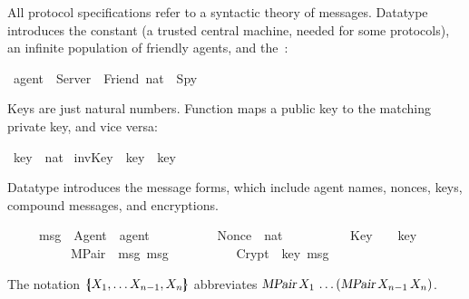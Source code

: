 %
\begin{isabellebody}%
\def\isabellecontext{Message}%
%
\isadelimtheory
%
\endisadelimtheory
%
\isatagtheory
%
\endisatagtheory
{\isafoldtheory}%
%
\isadelimtheory
%
\endisadelimtheory
%
\isadelimML
%
\endisadelimML
%
\isatagML
%
\endisatagML
{\isafoldML}%
%
\isadelimML
%
\endisadelimML
%
\isadelimproof
%
\endisadelimproof
%
\isatagproof
%
\endisatagproof
{\isafoldproof}%
%
\isadelimproof
%
\endisadelimproof
%
\isamarkuptrue%
%
\begin{isamarkuptext}%
All protocol specifications refer to a syntactic theory of messages. 
Datatype
 introduces the constant  (a trusted central
machine, needed for some protocols), an infinite population of
friendly agents, and the~:%
\end{isamarkuptext}%
\isamarkuptrue%
\isamarkupfalse%
\ agent\ {}\ Server\ {}\ Friend\ nat\ {}\ Spy%
\begin{isamarkuptext}%
Keys are just natural numbers.  Function  maps a public key to
the matching private key, and vice versa:%
\end{isamarkuptext}%
\isamarkuptrue%
\isamarkupfalse%
\ key\ {}\ nat\isanewline
{}\isamarkupfalse%
\ invKey\ {}{}\ {}key\ {}\ key{}%
\isadelimproof
%
\endisadelimproof
%
\isatagproof
%
\endisatagproof
{\isafoldproof}%
%
\isadelimproof
%
\endisadelimproof
%
\begin{isamarkuptext}%
Datatype
 introduces the message forms, which include agent names, nonces,
keys, compound messages, and encryptions.%
\end{isamarkuptext}%
\isamarkuptrue%
\isamarkupfalse%
\isanewline
\ \ \ \ \ msg\ {}\ Agent\ \ agent\isanewline
\ \ \ \ \ \ \ \ \ {}\ Nonce\ \ nat\isanewline
\ \ \ \ \ \ \ \ \ {}\ Key\ \ \ \ key\isanewline
\ \ \ \ \ \ \ \ \ {}\ MPair\ \ msg\ msg\isanewline
\ \ \ \ \ \ \ \ \ {}\ Crypt\ \ key\ msg%
\begin{isamarkuptext}%
\noindent
The notation $\mathopen{\{\kern-.30em|} X\sb 1,\ldots X\sb{n-1},X\sb n\mathclose{|\kern-.32em\}}$
abbreviates
$\emph{\sl MPair}\,X\sb 1\,\ldots\allowbreak(\emph{\sl MPair}\,X\sb{n-1}\,X\sb n)$.


\end{isamarkuptext}
\end{isabellebody}

